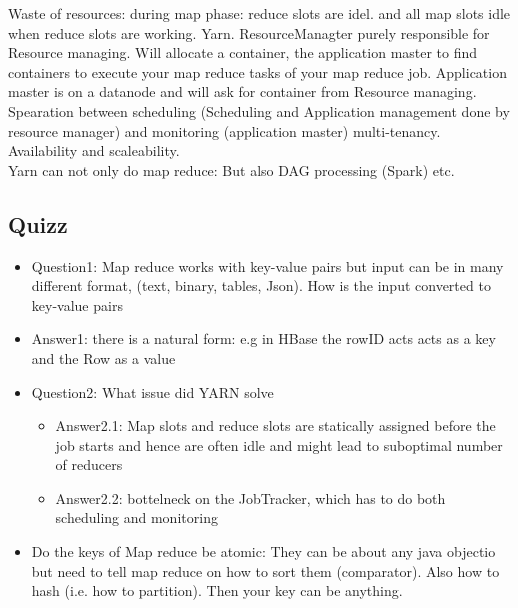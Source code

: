 Waste of resources: during map phase: reduce slots are idel. and all map slots idle when reduce slots are working.
\textrightarrow Yarn.
ResourceManagter purely responsible for Resource managing. Will allocate a container, the application master
to find containers to execute your map reduce tasks of your map reduce job.
Application master is on a datanode and will ask for container
from Resource managing. \\
Spearation between scheduling (Scheduling and Application management done by resource manager) and monitoring (application master)
\textrightarrow multi-tenancy. Availability and scaleability. \\
Yarn can not only do map reduce: But also DAG processing (Spark) etc.

\subsection{Quizz}
\begin{itemize}
    \item Question1: Map reduce works with key-value pairs but input can be in many different format,
    (text, binary, tables, Json). How is the input converted to key-value pairs
    \item Answer1: there is a natural form: e.g in HBase the rowID acts acts as a key and the Row as a value
    \item Question2: What issue did YARN solve
    \begin{itemize}
        \item Answer2.1: Map slots and reduce slots are statically assigned before the job starts
        and hence are often idle and might lead to suboptimal number of reducers
        \item Answer2.2: bottelneck on the JobTracker, which has to do both scheduling and monitoring
    \end{itemize}
    \item Do the keys of Map reduce be atomic: They can be about any java objectio but need to tell map reduce on how to sort them
    (comparator). Also how to hash (i.e. how to partition). Then your key can be anything.
\end{itemize}







